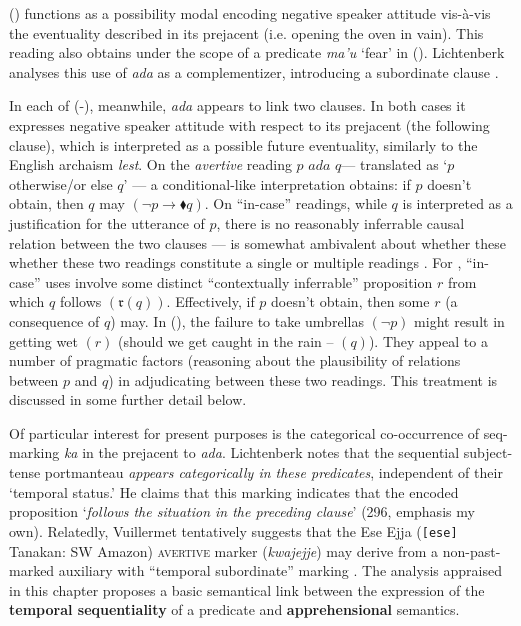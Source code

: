 () functions as a possibility modal encoding negative speaker attitude vis-à-vis the eventuality described in its prejacent (i.e. opening the oven in vain). This reading also obtains under the scope of a predicate \textit{ma'u} `fear' in (). Lichtenberk analyses this use of \textit{ada} as a complementizer, introducing a subordinate clause \citeyearpar[296]{Lichtenberk1995}. 

In each of (-), meanwhile, \textit{ada} appears to link two clauses. In both cases it expresses negative speaker attitude with respect to its prejacent (the following clause), which is interpreted as a possible future eventuality, similarly to the English archaism \textit{lest}. On the \textit{avertive} reading $ p \textit{ ada } q$--- translated as `$ p $ otherwise/or else $ q $' --- a conditional-like interpretation obtains: if $ p $ doesn't obtain, then $ q $ may $ (\neg p \to\blacklozenge q) $. On ``in-case'' readings, while $ q $ is interpreted as a justification for the utterance of $ p $, there is no reasonably inferrable causal relation between the two clauses --- \citeauthor{Lichtenberk1995} is somewhat ambivalent about whether these whether these two readings constitute a single or multiple readings \citeyearpar[298-302]{Lichtenberk1995}. For \citet{AnderBois2020}, ``in-case'' uses involve some distinct ``contextually inferrable'' proposition $ r $ from which $ q $ follows $ (\mathfrak{r}(q)) $. Effectively, if $ p$  doesn't obtain, then some $ r $ (a consequence of $ q $) may. In (), the failure to take umbrellas $( \neg p) $ might result in getting wet $ (r) $ (should we get caught in the rain -- $ (q) $). They appeal to a number of pragmatic factors (reasoning about the plausibility of relations between $ p $ and $ q $) in adjudicating between these two readings. This treatment is discussed in some further detail below.

 Of particular interest for present purposes is the categorical co-occurrence of {\sc seq}-marking \textit{ka} in the prejacent to \textit{ada}. Lichtenberk notes that the sequential subject-tense portmanteau \textit{appears categorically in these predicates}, independent of their `temporal status.' He claims that this marking indicates that the encoded proposition `\textit{follows the situation in the preceding clause}' (296, emphasis my own). Relatedly, Vuillermet tentatively suggests that the Ese Ejja (\texttt{[ese]} Tanakan: SW Amazon) \textsc{avertive} marker (\textit{kwajejje}) may derive from a non-past-marked auxiliary with ``temporal subordinate'' marking \citeyearpar[281]{Vuillermet2018}. The analysis appraised in this chapter proposes a basic semantical link between the expression of the \textbf{temporal sequentiality} of a predicate and \textbf{apprehensional} semantics.




